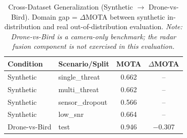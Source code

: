 \begin{table}[ht]
\centering
\caption{Cross-Dataset Generalization (Synthetic $\to$ Drone-vs-Bird).
         Domain gap = $\Delta$MOTA between synthetic in-distribution
         and real out-of-distribution evaluation.
         \textit{Note: Drone-vs-Bird is a camera-only benchmark;
         the radar fusion component is not exercised in this evaluation.}}
\label{tab:cross_dataset}
\begin{tabular}{llcc}
\toprule
Condition & Scenario/Split & MOTA & $\Delta$MOTA \\
\midrule
Synthetic & single\_threat  & 0.662 & -- \\
Synthetic & multi\_threat   & 0.662 & -- \\
Synthetic & sensor\_dropout & 0.566 & -- \\
Synthetic & low\_snr        & 0.664 & -- \\
Drone-vs-Bird & test        & 0.946 & $-$0.307 \\
\bottomrule
\end{tabular}
\end{table}
